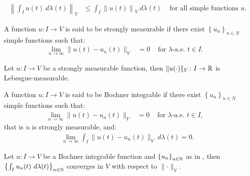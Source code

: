 \begin{lemma} %
    \begin{align}
        \left\lVert \int_I u(t) ~ d \lambda(t) \right\rVert_V &\leq \int_I \left\lVert u(t) \right\rVert_V ~ d \lambda(t) &\text{ for all simple functions } u.
    \end{align}
\end{lemma}

\begin{definition}
    A function $u\colon I \rightarrow V$ is said to be strongly measurable if there exist $\left\{ u_n \right\}_{n \in N}$ simple functions such that:
    \begin{align}
        \lim_{n \rightarrow \infty} \lVert u(t) - u_n(t) \rVert_V &= 0 &\text{ for } \lambda \text{-a.e. } t \in I.
&    \end{align}
\end{definition}

\begin{lemma}
    Let $u\colon I \rightarrow V$ be a strongly measurable function, then $\lVert u(\cdot) \rVert_V \colon I \rightarrow \mathbb{R}$ is Lebesgue-measurable.
\end{lemma}

\begin{definition} \label{definition:bochner_integrable}
    A function $u\colon I \rightarrow V$ is said to be Bochner integrable if there exist $\left\{ u_n \right\}_{n \in N}$ simple functions such that:
    \begin{align}
        \lim_{n \rightarrow \infty} \lVert u(t) - u_n(t) \rVert_V &= 0 &\text{ for } \lambda \text{-a.e. } t \in I,
&    \end{align}
    that is  $u$ is strongly measurable, and:
    \begin{align}
        \lim_{n \rightarrow \infty} \int_I \lVert u(t) - u_n(t) \rVert_V ~ d \lambda(t) = 0.
    \end{align}
\end{definition}

\begin{lemma}
    Let $u\colon I \rightarrow V$ be a Bochner integrable function and $\left\{ u_n \right\}_{n \in \mathbb{N}}$ as in , then $\left\{ \int_I u_n(t) ~ d \lambda(t) \right\}_{n \in \mathbb{N}}$ converges in $V$ with respect to $\lVert \cdot \rVert_V$.
\end{lemma}

